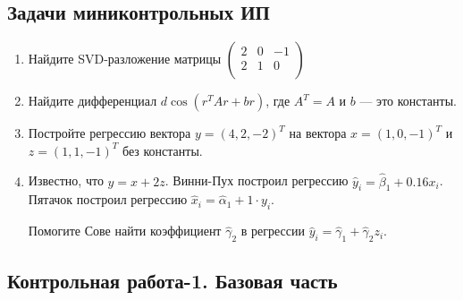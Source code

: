 \subsection{Задачи миниконтрольных ИП}

\begin{enumerate}
  \item Найдите SVD-разложение матрицы $
  \begin{pmatrix}
  2 & 0 & -1 \\
  2 & 1 & 0 \\
  \end{pmatrix}$
 \item Найдите дифференциал $d \cos(r^TAr+br)$, где $A^T=A$ и $b$ — это константы.
 \item Постройте регрессию вектора $y = (4,2,-2)^T$ на вектора $x=(1,0,-1)^T$ и $z=(1,1,-1)^T$
 без константы.
 \item Известно, что $y=x + 2z$. Винни-Пух построил регрессию $\hat y_i = \hat\beta_1 + 0.16 x_i$.
 Пятачок построил регрессию $\hat x_i = \hat \alpha_1 + 1\cdot y_i$.

 Помогите Сове найти коэффициент $\hat \gamma_2$ в регрессии $\hat y_i = \hat\gamma_1 + \hat\gamma_2 z_i$.
\end{enumerate}


\subsection{Контрольная работа-1. Базовая часть}

%
%
%
%
%
%
%
%
%
%


